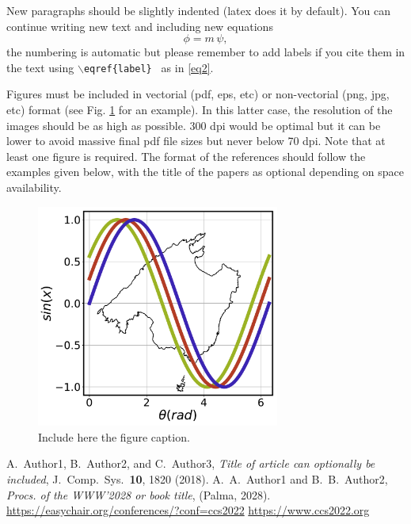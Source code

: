 \documentclass[a4paper]{article}
\begin{document}
New paragraphs should be slightly indented (latex does it by default). You can continue writing new text and including new equations
\begin{equation}
\label{eq2}
\phi = m\, \psi,
\end{equation}
the numbering is automatic but please remember to add labels if you cite them in the text using {\tt $\backslash$eqref\{label\} } as in \eqref{eq2}.

Figures must be included in vectorial (pdf, eps, etc) or non-vectorial (png, jpg, etc) format (see Fig. \ref{fig1} for an example). In this latter case, the resolution of the images should be as high as possible. 300 dpi would be optimal but it can be lower to avoid massive final pdf file sizes but never below 70 dpi. Note that at least one figure is required. The format of the references should follow the examples given below, with the title of the papers as optional depending on space availability.  


\begin{figure}[H]
\begin{center}
\includegraphics[width=8cm]{figure1}
\caption{Include here the figure caption.}
\label{fig1}
\end{center}
\end{figure}

\footnotesize
\begin{thebibliography}{9}
 A.~Author1, B.~Author2, and C.~Author3, \emph{Title of article can optionally be included}, J.\ Comp.\ Sys.\ \textbf{10}, 1820 (2018).
 A.~A.~Author1 and B.~B.~Author2, \emph{Procs. of the WWW'2028 or book title}, (Palma, 2028).
 {\color{blue} \underline{https://easychair.org/conferences/?conf=ccs2022} }
  {\color{blue} \underline{https://www.ccs2022.org} }
\end{thebibliography}
\end{document}
